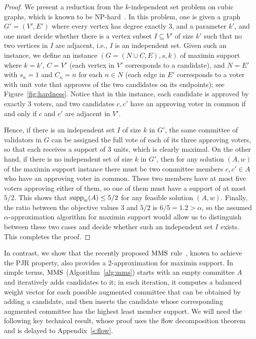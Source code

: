 \begin{proof}
We present a reduction from the $k$-independent set problem on cubic graphs, which is known to be NP-hard~\cite{johnson1979computers}. In this problem, one is given a graph $G'=(V',E')$ where every vertex has degree exactly 3, and a parameter $k'$, and one must decide whether there is a vertex subset $I\subseteq V'$ of size $k'$ such that no two vertices in $I$ are adjacent, i.e., $I$ is an independent set. 
Given such an instance, we define an instance $(G=(N\cup C, E), s, k)$ of maximin support where $k=k'$, $C=V'$ (each vertex in $V'$ corresponds to a candidate), and $N=E'$ with $s_n=1$ and $C_n=n$ for each $n\in N$ (each edge in $E'$ corresponds to a voter with unit vote that approves of the two candidates on its endpoints); see Figure~\ref{fig:hardness}.
Notice that in this instance, each candidate is approved by exactly 3 voters, and two candidates $c, c'$ have an approving voter in common if and only if $c$ and $c'$ are adjacent in $V'$.

Hence, if there is an independent set $I$ of size $k$ in $G'$, the same committee of validators in $G$ can be assigned the full vote of each of its three approving voters, so that each receives a support of 3 units, which is clearly maximal. On the other hand, if there is no independent set of size $k$ in $G'$, then for any solution $(A,w)$ of the maximin support instance there must be two committee members $c,c'\in A$ who have an approving voter in common. These two members have at most five voters approving either of them, so one of them must have a support of at most $5/2$. This shows that $\operatorname{supp}_w(A)\leq 5/2$ for any feasible solution $(A,w)$. Finally, the ratio between the objective values $3$ and $5/2$ is $6/5=1.2>\alpha$, so the assumed $\alpha$-approximation algorithm for maximin support would allow us to distinguish between these two cases and decide whether such an independent set $I$ exists. This completes the proof.
\end{proof}


In contrast, we show that the recently proposed $\operatorname{MMS}$ rule~\cite{sanchez2016maximin}, known to achieve the PJR property, also provides a 2-approximation for maximin support. 
In simple terms, $\operatorname{MMS}$ (Algorithm~\ref{alg:mms}) starts with an empty committee $A$ and iteratively adds candidates to it; in each iteration, it computes a balanced weight vector for each possible augmented committee that can be obtained by adding a candidate, and then inserts the candidate whose corresponding augmented committee has the highest least member support.
%
We will need the following key technical result, whose proof uses the flow decomposition theorem and is delayed to Appendix~\ref{s:flow}. 

